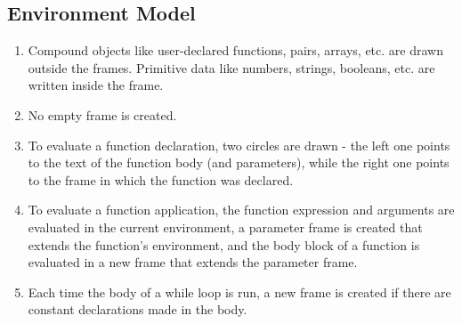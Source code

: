 \documentclass[11pt]{article}
\theoremstyle{definition}
\begin{document}
\subsection{Environment Model}
\begin{enumerate}
    \item Compound objects like user-declared functions, pairs, arrays, etc. are drawn outside the frames. Primitive data like numbers, strings, booleans, etc. are written inside the frame.
    \item No empty frame is created.
    \item To evaluate a function declaration, two circles are drawn - the left one points to the text of the function body (and parameters), while the right one points to the frame in which the function was declared.
    \item To evaluate a function application, the function expression and arguments are evaluated in the current environment, a parameter frame is created that extends the function's environment, and the body block of a function is evaluated in a new frame that extends the parameter frame.
    \item Each time the body of a while loop is run, a new frame is created if there are constant declarations made in the body.
    
\end{enumerate}
\end{document}
